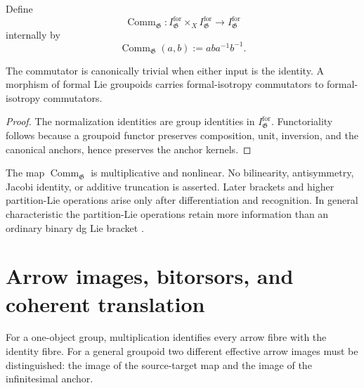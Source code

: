 \begin{definition}
\label{def:isotropy-commutator}
Define
\[
    \operatorname{Comm}_{\mathfrak G}:
    I^{\mathrm{for}}_{\mathfrak G}
    \times_X
    I^{\mathrm{for}}_{\mathfrak G}
    \longrightarrow
    I^{\mathrm{for}}_{\mathfrak G}
\]
internally by
\[
    \operatorname{Comm}_{\mathfrak G}(a,b)
    :=
    aba^{-1}b^{-1}.
\]
\end{definition}

\begin{proposition}
\label{prop:isotropy-commutator-properties}
The commutator is canonically trivial when either input is the identity.
A morphism of formal Lie groupoids carries formal-isotropy commutators to
formal-isotropy commutators.
\end{proposition}

\begin{proof}
The normalization identities are group identities in
$I^{\mathrm{for}}_{\mathfrak G}$.  Functoriality follows because a groupoid
functor preserves composition, unit, inversion, and the canonical anchors,
hence preserves the anchor kernels.
\end{proof}

\begin{remark}
\label{rem:commutator-not-bracket}
The map $\operatorname{Comm}_{\mathfrak G}$ is multiplicative and nonlinear.
No bilinearity, antisymmetry, Jacobi identity, or additive truncation is
asserted.  Later brackets and higher partition-Lie operations arise only
after differentiation and recognition.  In general characteristic the
partition-Lie operations retain more information than an ordinary binary
dg Lie bracket \cite{BrantnerMathew2025,BrantnerCamposNuiten2025}.
\end{remark}


\section{Arrow images, bitorsors, and coherent translation}
\label{sec:flg-bitorsor}

For a one-object group, multiplication identifies every arrow fibre with the
identity fibre.  For a general groupoid two different effective arrow images
must be distinguished: the image of the source-target map and the image of
the infinitesimal anchor.

